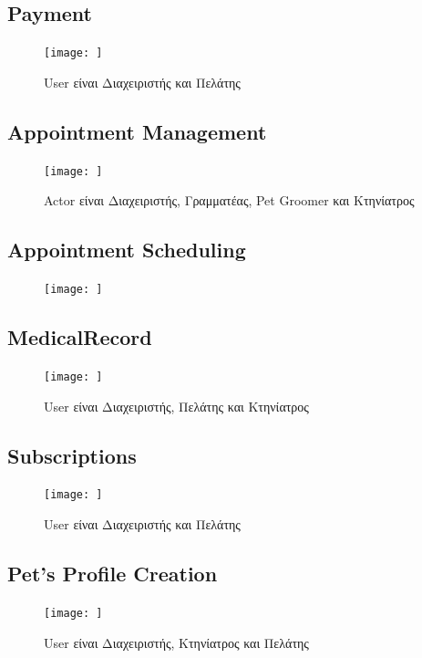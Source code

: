 \documentclass[12pt,a4paper,twoside]{book}
\begin{document}
\subsection{Payment}
\begin{figure}[H]
    \centering
    \texttt{[image: ]}
    \caption{User είναι Διαχειριστής και Πελάτης}\label{fig:sequence-payment}
\end{figure}

\subsection{Appointment Management}
\begin{figure}[H]
    \centering
    \texttt{[image: ]}
    \caption{Actor είναι Διαχειριστής, Γραμματέας, Pet Groomer και Κτηνίατρος}\label{fig:sequence-appointment-management}
\end{figure}

\subsection{Appointment Scheduling}
\begin{figure}[H]
    \centering
    \texttt{[image: ]}\label{fig:sequence-appointment-scheduling}
\end{figure}

\subsection{MedicalRecord}
\begin{figure}[H]
    \centering
    \texttt{[image: ]}
    \caption{User είναι Διαχειριστής, Πελάτης και Κτηνίατρος}\label{fig:sequence-medical-record}
\end{figure}

\subsection{Subscriptions}
\begin{figure}[H]
    \centering
    \texttt{[image: ]}
    \caption{User είναι Διαχειριστής και Πελάτης}\label{fig:sequence-subscription}
\end{figure}

\subsection{Pet's Profile Creation}
\begin{figure}[H]
    \centering
    \texttt{[image: ]}
    \caption{User είναι Διαχειριστής, Κτηνίατρος και Πελάτης}\label{fig:sequence-pet-profile}
\end{figure}
\end{document}
